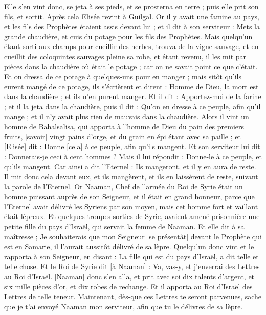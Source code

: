 \begin{multicols}{2}
Elle s'en vint donc, se jeta à ses pieds, et se prosterna en terre ; puis elle prit son fils, et sortit.
Après cela Elisée revint à Guilgal. Or il y avait une famine au pays, et les fils des Prophètes étaient assis devant lui ; et il dit à son serviteur : Mets la grande chaudière, et cuis du potage pour les fils des Prophètes.
Mais quelqu'un étant sorti aux champs pour cueillir des herbes, trouva de la vigne sauvage, et en cueillit des coloquintes sauvages pleine sa robe, et étant revenu, il les mit par pièces dans la chaudière où était le potage ; car on ne savait point ce que c'était.
Et on dressa de ce potage à quelques-uns pour en manger ; mais sitôt qu'ils eurent mangé de ce potage, ils s'écrièrent et dirent : Homme de Dieu, la mort est dans la chaudière ; et ils n'en purent manger.
Et il dit : Apportez-moi de la farine ; et il la jeta dans la chaudière, puis il dit : Qu'on en dresse à ce peuple, afin qu'il mange ; et il n'y avait plus rien de mauvais dans la chaudière.
Alors il vint un homme de Bahalsalisa, qui apporta à l'homme de Dieu du pain des premiers fruits, [savoir] vingt pains d'orge, et du grain en épi étant avec sa paille ; et [Elisée] dit : Donne [cela] à ce peuple, afin qu'ils mangent.
Et son serviteur lui dit : Donnerais-je ceci à cent hommes ? Mais il lui répondit : Donne-le à ce peuple, et qu'ils mangent. Car ainsi a dit l'Eternel : Ils mangeront, et il y en aura de reste.
Il mit donc cela devant eux, et ils mangèrent, et ils en laissèrent de reste, suivant la parole de l'Eternel.
\VerseOne{}Or Naaman, Chef de l'armée du Roi de Syrie était un homme puissant auprès de son Seigneur, et il était en grand honneur, parce que l'Eternel avait délivré les Syriens par son moyen, mais cet homme fort et vaillant était lépreux.
Et quelques troupes sorties de Syrie, avaient amené prisonnière une petite fille du pays d'Israël, qui servait la femme de Naaman.
Et elle dit à sa maîtresse ; Je souhaiterais que mon Seigneur [se présentât] devant le Prophète qui est en Samarie, il l'aurait aussitôt délivré de sa lèpre.
Quelqu'un donc vint et le rapporta à son Seigneur, en disant : La fille qui est du pays d'Israël, a dit telle et telle chose.
Et le Roi de Syrie dit [à Naaman] : Va, vas-y, et j'enverrai des Lettres au Roi d'Israël. [Naaman] donc s'en alla, et prit avec soi dix talents d'argent, et six mille pièces d'or, et dix robes de rechange.
Et il apporta au Roi d'Israël des Lettres de telle teneur. Maintenant, dès-que ces Lettres te seront parvenues, sache que je t'ai envoyé Naaman mon serviteur, afin que tu le délivres de sa lèpre.

\end{multicols}

